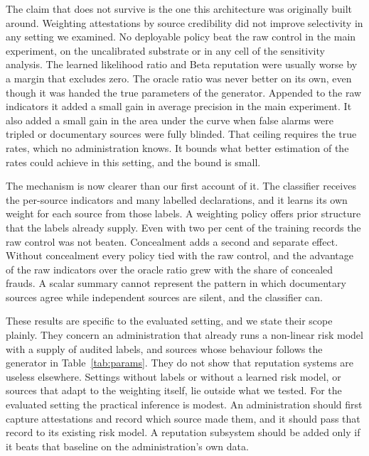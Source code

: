 \documentclass[information,article,submit,moreauthors]{Definitions/mdpi}
\begin{document}
The claim that does not survive is the one this architecture was originally built around. Weighting attestations by source credibility did not improve selectivity in any setting we examined. No deployable policy beat the raw control in the main experiment, on the uncalibrated substrate or in any cell of the sensitivity analysis. The learned likelihood ratio and Beta reputation were usually worse by a margin that excludes zero. The oracle ratio was never better on its own, even though it was handed the true parameters of the generator. Appended to the raw indicators it added a small gain in average precision in the main experiment. It also added a small gain in the area under the curve when false alarms were tripled or documentary sources were fully blinded. That ceiling requires the true rates, which no administration knows. It bounds what better estimation of the rates could achieve in this setting, and the bound is small.

The mechanism is now clearer than our first account of it. The classifier receives the per-source indicators and many labelled declarations, and it learns its own weight for each source from those labels. A weighting policy offers prior structure that the labels already supply. Even with two per cent of the training records the raw control was not beaten. Concealment adds a second and separate effect. Without concealment every policy tied with the raw control, and the advantage of the raw indicators over the oracle ratio grew with the share of concealed frauds. A scalar summary cannot represent the pattern in which documentary sources agree while independent sources are silent, and the classifier can.

These results are specific to the evaluated setting, and we state their scope plainly. They concern an administration that already runs a non-linear risk model with a supply of audited labels, and sources whose behaviour follows the generator in Table~\ref{tab:params}. They do not show that reputation systems are useless elsewhere. Settings without labels or without a learned risk model, or sources that adapt to the weighting itself, lie outside what we tested. For the evaluated setting the practical inference is modest. An administration should first capture attestations and record which source made them, and it should pass that record to its existing risk model. A reputation subsystem should be added only if it beats that baseline on the administration's own data.
\end{document}
